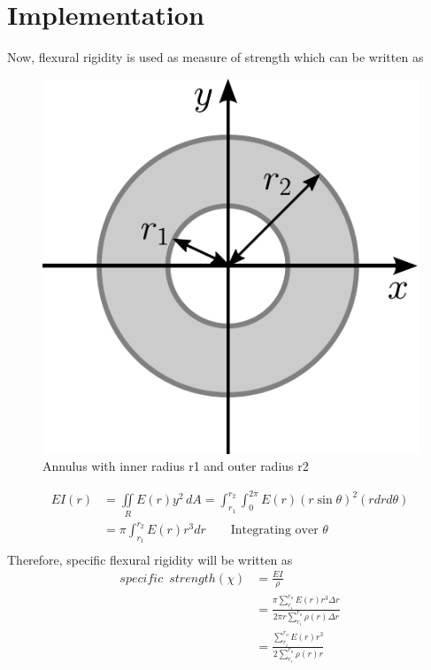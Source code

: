 \documentclass[openright,twoside]{iitkthesis}
\begin{document}
\section{Implementation}
Now, flexural rigidity is used as measure of strength which can be written as 
\begin{figure}
\begin{center}
\includegraphics[scale=0.5]{moment_annulus}
\caption{Annulus with inner radius r1 and outer radius r2}
\end{center}
\end{figure}
\begin{equation}
\begin{split}
EI(r) &= \underset{R}{\iint}E(r)y^2\,dA = \int_{r_1}^{r_2}\int_0^{2\pi} E(r)(r\sin\theta)^2(rdrd\theta)\\
&= \pi\int_{r_1}^{r_2} E(r)r^3 dr \qquad \text{Integrating over $\theta$}\\
\end{split}
\end{equation}
Therefore, specific flexural rigidity will be written as
\begin{equation}\label{objective_eb}
\begin{split}
specific\,\,\,strength(\chi) &=\frac{EI}{\rho}\\
&=\frac{\pi\sum^{r_o}_{r_i}E(r)r^3\Delta r}{2\pi r\sum^{r_o}_{r_i}\rho(r)\Delta r}\\
&=\frac{\sum^{r_o}_{r_i}E(r)r^3}{2 \sum^{r_o}_{r_i}\rho(r)r}
\end{split}
\end{equation}
\end{document}
